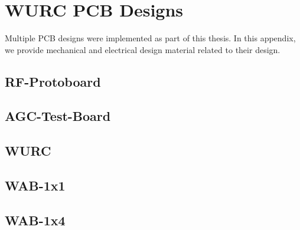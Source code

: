 \chapter{WURC PCB Designs}
\label{sec_wurc_pcd_designs}

Multiple PCB designs were implemented as part of this thesis. In this appendix, we provide mechanical and electrical design material related to their design.

\section{RF-Protoboard}

\section{AGC-Test-Board}

\section{WURC}

\section{WAB-1x1}

\section{WAB-1x4}


%
%
%
